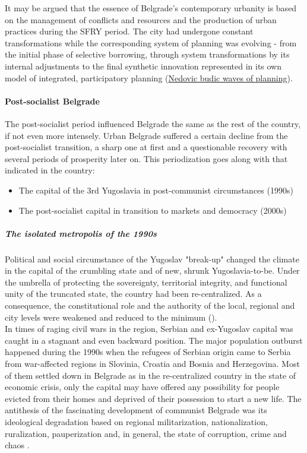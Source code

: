 \documentclass[11pt]{report}
\begin{document}
It may be argued that the essence of Belgrade's contemporary urbanity is based on the management of conflicts and resources and the production of urban practices during the SFRY period. The city had undergone constant transformations while the corresponding system of planning was evolving - from the initial phase of selective borrowing, through system transformations by its internal adjustments to the final synthetic innovation represented in its own model of integrated, participatory planning (\href{}{Nedovic budic waves of planning}).

\paragraph{Post-socialist Belgrade}

The post-socialist period influenced Belgrade the same as the rest of the country, if not even more intensely. Urban Belgrade suffered a certain decline from the post-socialist transition, a sharp one at first and a questionable recovery with several periods of prosperity later on. This periodization goes along with that indicated in the country:

\begin{itemize}
\item The capital of the 3rd Yugoslavia in post-communist circumstances (1990s)
\item The post-socialist capital in transition to markets and democracy (2000s)
\end{itemize}

\subparagraph{The isolated metropolis of the 1990s}

Political and social circumstance of the Yugoslav "break-up" changed the climate in the capital of the crumbling state and of new, shrunk Yugoslavia-to-be.
Under the umbrella of protecting the sovereignty, territorial integrity,  and functional unity of the truncated state, the country had been re-centralized.
As a consequence, the constitutional role and the authority of the local, regional and city levels were weakened and reduced to the minimum (\cite{Vujosevic 2015 Regionalizam u Srbiji 2}). 
\\

In times of raging civil wars in the region, Serbian and ex-Yugoslav capital was caught in a stagnant and even backward position.
The major population outburst happened during the 1990s when the refugees of Serbian origin came to Serbia from war-affected regions in Slovinia, Croatia and Bosnia and Herzegovina.
Most of them settled down in Belgrade as in the re-centralized country in the state of economic crisis, only the capital may have offered any possibility for people evicted from their homes and deprived of their possession to start a new life.
The antithesis of the fascinating development of communist Belgrade was its ideological  degradation  based  on regional militarization, nationalization, ruralization, pauperization and, in general, the state of corruption, crime and chaos \cite{ref}. 
\\
\end{document}
